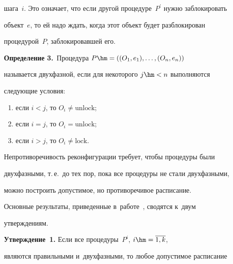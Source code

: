 шага~$i$. Это означает, что если другой процедуре~$P^\prime$ нужно заблокировать 


объект~$e$, то ей надо ждать, когда этот объект будет разблокирован 


процедурой~$P$, заблокировавшей его. 


  


  \smallskip


  


  \noindent


  \textbf{Определение 3.}\ Процедура $P\hm= ((O_1, e_1),\ldots , (O_n, e_n))$ 


называется двухфазной, если для некоторого $j\hm<n$ выполняются 


следующие условия:


  \begin{enumerate}[(1)]


\item если $i<j$, то $O_i \not=\mathrm{unlock}$;


\item если $i=j$, то $O_i=\mathrm{unlock}$;


\item если $i>j$, то $O_i\not=\mathrm{lock}$.


\end{enumerate}


  


  Непротиворечивость реконфигурации требует, чтобы процедуры были 


двухфазными, т.\,е.\ до тех пор, пока все процедуры не стали двухфазными, 


можно построить допустимое, но противоречивое расписание. 


  


  Основные результаты, приведенные в~работе~\cite{6-g3}, сводятся к~двум 


утверждениям.


  


  \smallskip


  


  \noindent


  \textbf{Утверждение~1.} Если все процедуры~$P^i$, $i\hm=\overline{1,k}$, 


являются правильными и~двухфазными, то любое допустимое расписание 


